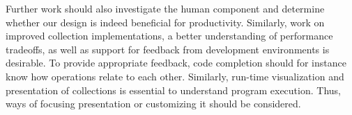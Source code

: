 \documentclass[sigconf, 10pt]{acmart}
\begin{document}
Further work should also investigate the human component and determine whether
our design is indeed beneficial for productivity.
Similarly, work on improved collection implementations,
a better understanding of performance tradeoffs,
as well as support for feedback from development environments is desirable. 
To provide appropriate feedback,
code completion should for instance know how operations relate to each other.
Similarly, run-time visualization and presentation of collections
is essential to understand program execution.
Thus, ways of focusing presentation or customizing it should be considered.

%
%







\end{document}
